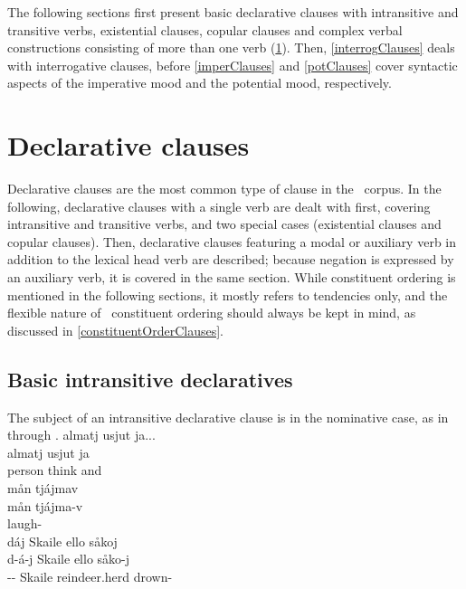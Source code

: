 The following sections first present basic declarative clauses with intransitive and transitive verbs, existential clauses, copular clauses and complex verbal constructions consisting of more than one verb (\SEC\ref{declClauses}). Then, \SEC\ref{interrogClauses} deals with interrogative clauses, %
before \SEC\ref{imperClauses} and \SEC\ref{potClauses} cover syntactic aspects of the imperative mood and the potential mood, respectively.


\section{Declarative clauses}\label{declClauses}
Declarative clauses are the most common type of clause in the \PS\ corpus. In the following, declarative clauses with a single verb are dealt with first, covering intransitive and transitive verbs, and two special cases (existential clauses and copular clauses). Then, declarative clauses featuring a modal or auxiliary verb in addition to the lexical head verb are described; because negation is expressed by an auxiliary verb, it is covered in the same section. While constituent ordering is mentioned in the following sections, it mostly refers to tendencies only, and the flexible nature of \PS\ constituent ordering should always be kept in mind, as discussed in \SEC\ref{constituentOrderClauses}. 

\subsection{Basic intransitive declaratives}\label{basicIntransDeclaratives}
The subject of an intransitive declarative clause is in the nominative case, %
as in  through . 
\ea\label{basicIntransDeclaratives1}
\glll	almatj usjut ja...\\
	almatj usjut ja\\
	person\BS{} think\BS{} and \\%
 
\z
\ea\label{basicIntransDeclaratives2}
\glll	mån tjájmav\\
	mån tjájma-v\\
	 laugh- \\\nopagebreak
{} 
\z
\ea\label{basicIntransDeclaratives3}
\glll	dáj Skaile ello såkoj\\
	d-á-j Skaile ello såko-j\\
	-- Skaile\BS{} reindeer.herd\BS{} drown- \\\nopagebreak
{} 
\z


